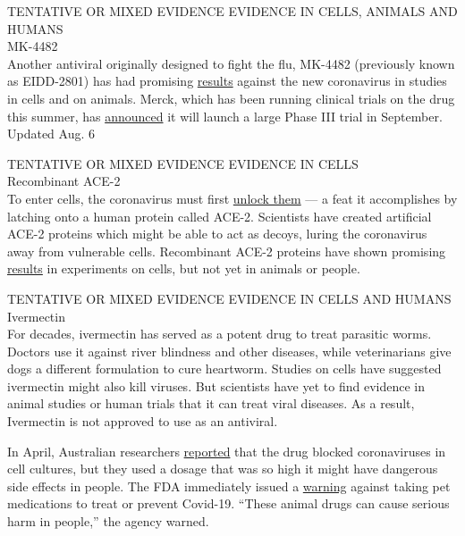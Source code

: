 TENTATIVE OR MIXED EVIDENCE EVIDENCE IN CELLS, ANIMALS AND HUMANS\\
MK-4482\\
Another antiviral originally designed to fight the flu, MK-4482
(previously known as EIDD-2801) has had promising
\href{https://stm.sciencemag.org/content/12/541/eabb5883}{results}
against the new coronavirus in studies in cells and on animals. Merck,
which has been running clinical trials on the drug this summer, has
\href{https://www.cnbc.com/2020/07/31/merck-aims-to-start-large-pivotal-studies-on-coronavirus-treatment-in-september.html}{announced}
it will launch a large Phase III trial in September.\\
Updated Aug. 6

TENTATIVE OR MIXED EVIDENCE EVIDENCE IN CELLS\\
Recombinant ACE-2\\
To enter cells, the coronavirus must first
\href{https://www.nytimes3xbfgragh.onion/interactive/2020/03/11/science/how-coronavirus-hijacks-your-cells.html}{unlock
them} --- a feat it accomplishes by latching onto a human protein called
ACE-2. Scientists have created artificial ACE-2 proteins which might be
able to act as decoys, luring the coronavirus away from vulnerable
cells. Recombinant ACE-2 proteins have shown promising
\href{https://doi.org/10.1016/j.cell.2020.04.004}{results} in
experiments on cells, but not yet in animals or people.

TENTATIVE OR MIXED EVIDENCE EVIDENCE IN CELLS AND HUMANS\\
Ivermectin\\
For decades, ivermectin has served as a potent drug to treat parasitic
worms. Doctors use it against river blindness and other diseases, while
veterinarians give dogs a different formulation to cure heartworm.
Studies on cells have suggested ivermectin might also kill viruses. But
scientists have yet to find evidence in animal studies or human trials
that it can treat viral diseases. As a result, Ivermectin is not
approved to use as an antiviral.

In April, Australian researchers
\href{https://www.sciencedirect.com/science/article/pii/S0166354220302011}{reported}
that the drug blocked coronaviruses in cell cultures, but they used a
dosage that was so high it might have dangerous side effects in people.
The FDA immediately issued a
\href{https://www.fda.gov/animal-veterinary/product-safety-information/fda-letter-stakeholders-do-not-use-ivermectin-intended-animals-treatment-covid-19-humans}{warning}
against taking pet medications to treat or prevent Covid-19. ``These
animal drugs can cause serious harm in people,'' the agency warned.

